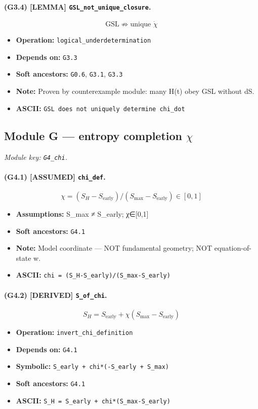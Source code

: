 \documentclass[11pt,a4paper]{article}
\theoremstyle{remark}\newtheorem*{caution}{Caution}
\newcommand{\tagbox}[1]{\textsc{[#1]}}
\begin{document}
\paragraph{(G3.4) \tagbox{LEMMA} \texttt{GSL\_not\_unique\_closure}.}
\begin{equation}
\mathrm{GSL}\not\Rightarrow\text{unique }\dot\chi
\tag{G3.4}
\end{equation}
\begin{itemize}\setlength{\itemsep}{0.12em}
\item \textbf{Operation:} \texttt{logical\_underdetermination}
\item \textbf{Depends on:} \texttt{G3.3}
\item \textbf{Soft ancestors:} \texttt{G0.6}, \texttt{G3.1}, \texttt{G3.3}
\item \textbf{Note:} Proven by counterexample module: many H(t) obey GSL without dS.
\item \textbf{ASCII:} \texttt{GSL does not uniquely determine chi\_dot}
\end{itemize}
\subsection{Module G --- entropy completion $\chi$}
\textit{Module key: \texttt{G4\_chi}.}
\paragraph{(G4.1) \tagbox{ASSUMED} \texttt{chi\_def}.}
\begin{equation}
\chi=(S_H-S_{\mathrm{early}})/(S_{\max}-S_{\mathrm{early}})\in[0,1]
\tag{G4.1}
\end{equation}
\begin{itemize}\setlength{\itemsep}{0.12em}
\item \textbf{Assumptions:} S\_max ≠ S\_early; χ∈[0,1]
\item \textbf{Soft ancestors:} \texttt{G4.1}
\item \textbf{Note:} Model coordinate — NOT fundamental geometry; NOT equation-of-state w.
\item \textbf{ASCII:} \texttt{chi = (S\_H-S\_early)/(S\_max-S\_early)}
\end{itemize}
\paragraph{(G4.2) \tagbox{DERIVED} \texttt{S\_of\_chi}.}
\begin{equation}
S_H=S_{\mathrm{early}}+\chi(S_{\max}-S_{\mathrm{early}})
\tag{G4.2}
\end{equation}
\begin{itemize}\setlength{\itemsep}{0.12em}
\item \textbf{Operation:} \texttt{invert\_chi\_definition}
\item \textbf{Depends on:} \texttt{G4.1}
\item \textbf{Symbolic:} \texttt{S\_early + chi*(-S\_early + S\_max)}
\item \textbf{Soft ancestors:} \texttt{G4.1}
\item \textbf{ASCII:} \texttt{S\_H = S\_early + chi*(S\_max-S\_early)}
\end{itemize}
\end{document}
